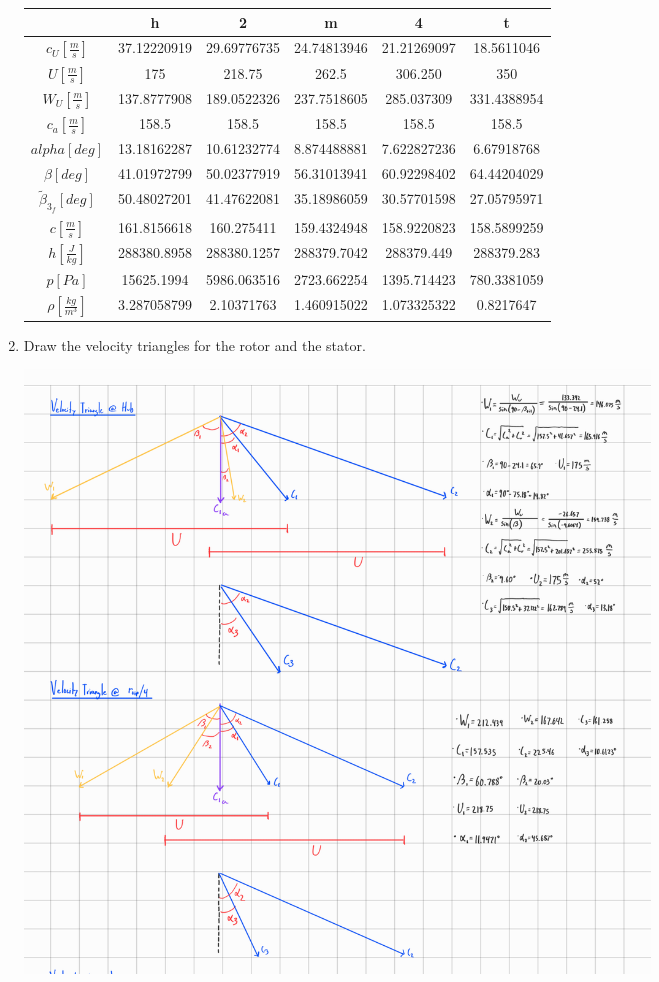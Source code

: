 \documentclass[titlepage]{article}
\begin{document}
\begin{enumerate}
    \begin{center}
        \begin{tabular}{|c|c|c|c|c|c|}
            \hline
            & h & 2 & m & 4 & t \\
            \hline
            $c_{U} [\frac{m}{s}]$ & 37.12220919 & 29.69776735 & 24.74813946 & 21.21269097 & 18.5611046 \\
            \hline
            $U [\frac{m}{s}]$ & 175 & 218.75 & 262.5 & 306.250 & 350 \\
            \hline
            $W_{U} [\frac{m}{s}]$ & 137.8777908&189.0522326&237.7518605&285.037309 &331.4388954 \\
            \hline
            $c_{a} [\frac{m}{s}]$ & 158.5 & 158.5 & 158.5 & 158.5 & 158.5 \\
            \hline
            $alpha [deg]$ &13.18162287&10.61232774&8.874488881&7.622827236&6.67918768 \\
            \hline
            $\beta [deg]$ & 41.01972799&50.02377919&56.31013941&60.92298402&64.44204029 \\
            \hline
            $\tilde{\beta}_{3_{f}} [deg]$ & 50.48027201&41.47622081&35.18986059&30.57701598&27.05795971 \\
            \hline
            $c [\frac{m}{s}]$ & 161.8156618&160.275411&159.4324948&158.9220823&158.5899259 \\
            \hline
            $h [\frac{J}{kg}]$ & 288380.8958&288380.1257&288379.7042&288379.449&288379.283 \\
            \hline
            $p [Pa]$ & 15625.1994&5986.063516&2723.662254&1395.714423&780.3381059 \\
            \hline
            $\rho [\frac{kg}{m^{3}}]$ & 3.287058799&2.10371763&1.460915022&1.073325322&0.8217647 \\
            \hline
        \end{tabular}
    \end{center}

    \item Draw the velocity triangles for the rotor and the stator.
    
    \begin{center}
        \includegraphics[width=0.75\textwidth]{veltri1.png}
    \end{center}


\end{enumerate}
\end{document}
